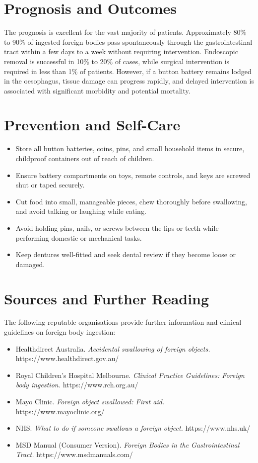\section*{Prognosis and Outcomes}
The prognosis is excellent for the vast majority of patients. Approximately 80\% to 90\% of ingested foreign bodies pass spontaneously through the gastrointestinal tract within a few days to a week without requiring intervention. Endoscopic removal is successful in 10\% to 20\% of cases, while surgical intervention is required in less than 1\% of patients. However, if a button battery remains lodged in the oesophagus, tissue damage can progress rapidly, and delayed intervention is associated with significant morbidity and potential mortality.

\section*{Prevention and Self-Care}
\begin{itemize}
    \item Store all button batteries, coins, pins, and small household items in secure, childproof containers out of reach of children.
    \item Ensure battery compartments on toys, remote controls, and keys are screwed shut or taped securely.
    \item Cut food into small, manageable pieces, chew thoroughly before swallowing, and avoid talking or laughing while eating.
    \item Avoid holding pins, nails, or screws between the lips or teeth while performing domestic or mechanical tasks.
    \item Keep dentures well-fitted and seek dental review if they become loose or damaged.
\end{itemize}

\section*{Sources and Further Reading}
The following reputable organisations provide further information and clinical guidelines on foreign body ingestion:
\begin{itemize}
    \item Healthdirect Australia. \textit{Accidental swallowing of foreign objects.} https://www.healthdirect.gov.au/
    \item Royal Children's Hospital Melbourne. \textit{Clinical Practice Guidelines: Foreign body ingestion.} https://www.rch.org.au/
    \item Mayo Clinic. \textit{Foreign object swallowed: First aid.} https://www.mayoclinic.org/
    \item NHS. \textit{What to do if someone swallows a foreign object.} https://www.nhs.uk/
    \item MSD Manual (Consumer Version). \textit{Foreign Bodies in the Gastrointestinal Tract.} https://www.msdmanuals.com/
\end{itemize}
